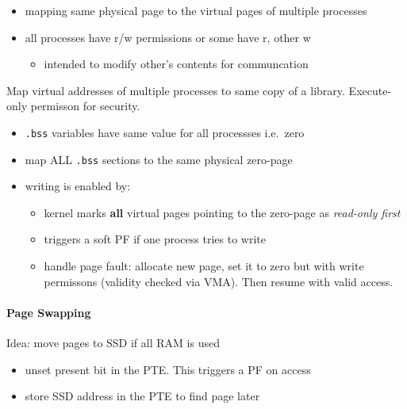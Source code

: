 \newpar{}

\begin{itemize}
    \item mapping same physical page to the virtual pages of multiple processes
    \item all processes have r/w permissions or some have r, other w
    \begin{itemize}
        \item intended to modify other's contents for communcation
    \end{itemize}
\end{itemize}

\newpar{}

Map virtual addresses of multiple processes to same copy of a library. Execute-only permisson for security.

\newpar{}

\begin{itemize}
    \item \texttt{.bss} variables have same value for all processses i.e.\ zero
    \item map ALL \texttt{.bss} sections to the same physical zero-page 
    \item writing is enabled by:
    \begin{itemize}
        \item kernel marks \textbf{all} virtual pages pointing to the zero-page as \textit{read-only first}
        \item triggers a soft PF if one process tries to write
        \item handle page fault: allocate new page, set it to zero but with write permissons (validity checked via VMA). Then resume with valid access.
    \end{itemize}
\end{itemize}

\paragraph{Page Swapping}
Idea: move pages to SSD if all RAM is used
\begin{itemize}
    \item unset present bit in the PTE. This triggers a PF on access
    \item store SSD address in the PTE to find page later 
\end{itemize}

\newpar{}

